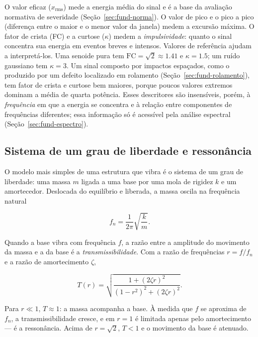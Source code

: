 O valor eficaz ($x_{\mathrm{rms}}$) mede a energia média do sinal e é a base da avaliação
normativa de severidade (Seção~\ref{sec:fund-norma}). O valor de pico e o pico a pico
(diferença entre o maior e o menor valor da janela) medem a excursão máxima. O fator de
crista (FC) e a curtose ($\kappa$) medem a \emph{impulsividade}: quanto o sinal concentra
sua energia em eventos breves e intensos. Valores de referência ajudam a interpretá-los.
Uma senoide pura tem $\mathrm{FC} = \sqrt{2} \approx \num{1,41}$ e $\kappa = \num{1,5}$;
um ruído gaussiano tem $\kappa = 3$. Um sinal composto por impactos espaçados, como o
produzido por um defeito localizado em rolamento (Seção~\ref{sec:fund-rolamento}), tem
fator de crista e curtose bem maiores, porque poucos valores extremos dominam a média de
quarta potência. Esses descritores são insensíveis, porém, à \emph{frequência} em que a
energia se concentra e à relação entre componentes de frequências diferentes; essa
informação só é acessível pela análise espectral (Seção~\ref{sec:fund-espectro}).

\subsection{Sistema de um grau de liberdade e ressonância}
\label{sec:fund-1gdl}

O modelo mais simples de uma estrutura que vibra é o sistema de um grau de liberdade: uma
massa $m$ ligada a uma base por uma mola de rigidez $k$ e um amortecedor. Deslocada do
equilíbrio e liberada, a massa oscila na frequência natural \cite{brandt2011}

\begin{equation}
f_n = \frac{1}{2\pi}\sqrt{\frac{k}{m}}.
\label{eq:fund-fn}
\end{equation}

Quando a base vibra com frequência $f$, a razão entre a amplitude do movimento da massa e a
da base é a \emph{transmissibilidade}. Com a razão de frequências $r = f/f_n$ e a razão de
amortecimento $\zeta$,

\begin{equation}
T(r) = \sqrt{\frac{1 + (2\zeta r)^2}{(1-r^2)^2 + (2\zeta r)^2}}.
\label{eq:fund-transmissibilidade}
\end{equation}

Para $r \ll 1$, $T \approx 1$: a massa acompanha a base. À medida que $f$ se aproxima de
$f_n$, a transmissibilidade cresce, e em $r = 1$ é limitada apenas pelo amortecimento ---
é a ressonância. Acima de $r = \sqrt{2}$, $T < 1$ e o movimento da base é atenuado.

